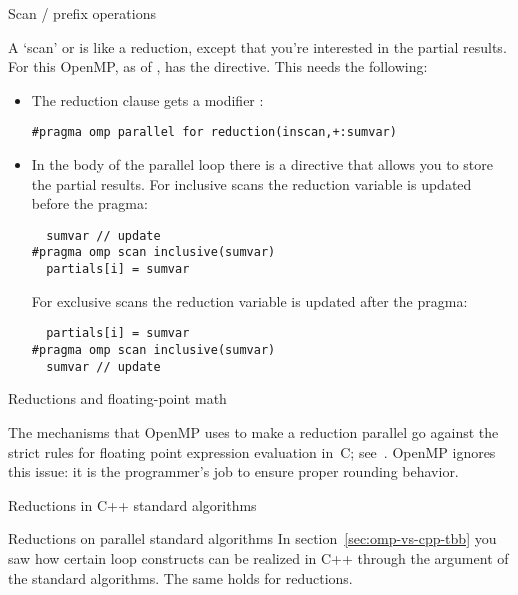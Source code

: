 
 {Scan / prefix operations}

A `scan' or 
is like a reduction, except that you're interested
in the partial results.
For this OpenMP, as of , has the  directive.
This needs the following:
\begin{itemize}
\item The reduction clause gets a modifier :
\begin{lstlisting}
#pragma omp parallel for reduction(inscan,+:sumvar)
\end{lstlisting}
\item In the body of the parallel loop there is a  directive
  that allows you to store the partial results.
  For inclusive scans the reduction variable is updated before the  pragma:
\begin{lstlisting}
  sumvar // update
#pragma omp scan inclusive(sumvar)
  partials[i] = sumvar
\end{lstlisting}
  For exclusive scans the reduction variable is updated after the  pragma:
\begin{lstlisting}
  partials[i] = sumvar
#pragma omp scan inclusive(sumvar)
  sumvar // update
\end{lstlisting}
\end{itemize}


 {Reductions and floating-point math}

The mechanisms that OpenMP uses to make a reduction parallel go
against the strict rules for floating point expression evaluation in~C;
see~. OpenMP ignores this issue: it is the
programmer's job to ensure proper rounding behavior.


 {Reductions in C++ standard algorithms}

\begin{cppnote}{Reductions on parallel standard algorithms}
  In section~\ref{sec:omp-vs-cpp-tbb} you saw how certain loop constructs
  can be realized in C++ through the  argument
  of the standard algorithms. The same holds for reductions.
\end{cppnote}


